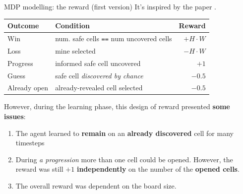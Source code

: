 \begin{frame}{MDP modelling: the reward (first version)}
  It's inspired by the paper \textcite{wang2025minesweepercnn}.
  \begin{table}
    \centering
    \renewcommand{\arraystretch}{0.95}
    \begin{tabularx}{\textwidth}{l X r}
      \textbf{Outcome} & \textbf{Condition}                              & \textbf{Reward} \\
      \midrule
      Win              & num. safe cells \texttt{==} num uncovered cells & $+ H \cdot W $  \\
      Loss             & mine selected                                   & $- H \cdot W $  \\
      Progress         & informed safe cell uncovered                    & $+1$            \\
      Guess            & safe cell \textit{discovered by chance}         & $-0.5$          \\
      Already open     & already-revealed cell selected                  & $-0.5$          \\
    \end{tabularx}
  \end{table}
  However, during the learning phase, this design of reward presented \textbf{some issues}:
  \begin{enumerate}
    \item The agent learned to \textbf{remain} on an \textbf{already discovered} cell for many timesteps
    \item During \textit{a progression} more than one cell could
          be opened. However, the reward was still $+1$ \textbf{independently} on the number of the \textbf{opened cells}.
    \item The overall reward was dependent on the board size.
  \end{enumerate}
\end{frame}

